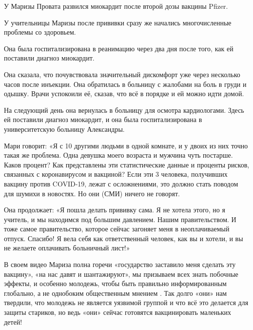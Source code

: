 У Маризы Провата развился миокардит после второй дозы вакцины Pfizer.

У учительницы Маризы после прививки сразу же начались многочисленные проблемы со
здоровьем.

Она была госпитализирована в реанимацию через два дня после того, как ей
поставили диагноз миокардит.

Она сказала, что почувствовала значительный дискомфорт уже через несколько часов
после инъекции. Она обратилась в больницу с жалобами на боль в груди и
одышку. Врачи успокоили её, сказав, что всё в порядке и ей можно идти домой.

На следующий день она вернулась в больницу для осмотра кардиологами. Здесь ей
поставили диагноз миокардит, и она была госпитализирована в университетскую
больницу Александры.

Мари говорит: «Я с 10 другими людьми в одной комнате, и у двоих из них точно
такая же проблема. Одна девушка моего возраста и мужчина чуть постарше. Каков
процент? Как представлены эти статистические данные и проценты рисков, связанных
с коронавирусом и вакциной? Если эти 3 человека, получивших вакцину против
COVID-19, лежат с осложнениями, это должно стать поводом для шумихи в
новостях. Но они (СМИ) ничего не говорят.

Она продолжает: «Я пошла делать прививку сама. Я не хотела этого, но я учитель,
и мы находимся под большим давлением. Нашим правительством. И тоже самое
правительство, которое сейчас загоняет меня в неоплачиваемый отпуск. Спасибо! Я
вела себя как ответственный человек, как вы и хотели, и вы не желаете оплачивать
больничный лист!»

В своем видео Мариза полна горечи «государство заставило меня сделать эту
вакцину», «на нас давят и шантажируют», мы призываем всех знать побочные
эффекты, и особенно молодежь, чтобы быть правильно информированным глобально, а
не однобоким общественным мнением . Так долго «они» нам твердили, что молодежь
не является уязвимой группой и что всё это делается для защиты стариков, но ведь
«они» сейчас готовятся вакцинировать маленьких детей!
